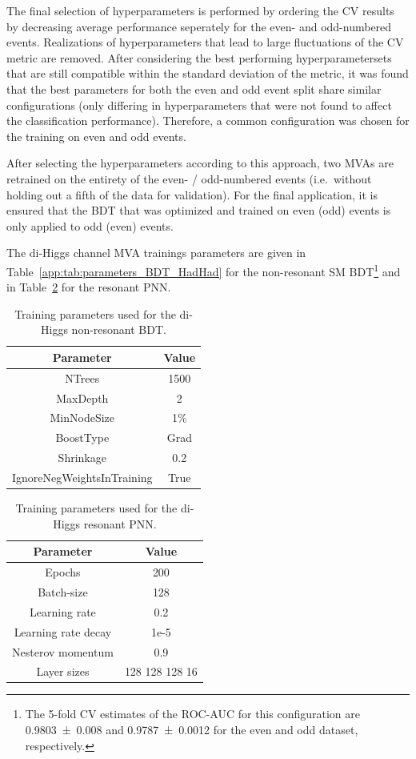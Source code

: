 The final selection of hyperparameters is performed by ordering the CV
results by decreasing average performance seperately for the even- and
odd-numbered events. Realizations of hyperparameters that lead to
large fluctuations of the CV metric are removed. After considering the
best performing hyperparametersets that are still compatible within
the standard deviation of the metric, it was found that the best
parameters for both the even and odd event split share similar
configurations (only differing in hyperparameters that were not
found to affect the classification performance). Therefore, a common
configuration was chosen for the training on even and odd events.

After selecting the hyperparameters according to this approach, two
MVAs are retrained on the entirety of the even- / odd-numbered events
(i.e.\ without holding out a fifth of the data for validation). For
the final application, it is ensured that the BDT that was optimized
and trained on even (odd) events is only applied to odd (even) events.

The di-Higgs \hadhad channel MVA trainings parameters are given in
Table~\ref{app:tab:parameters_BDT_HadHad} for the non-resonant SM
BDT\footnote{The 5-fold CV estimates of the ROC-AUC for this
  configuration are \num{0.9803 +- 0.008} and \num{0.9787 +- 0.0012}
  for the even and odd dataset, respectively.} and in
Table~\ref{tab:parameters_PNN_HadHad} for the resonant PNN.

\begin{table}
\centering
\small
\begin{tabular}{|c|c|}
\hline
Parameter & Value\\
\hline
NTrees & 1500\\
MaxDepth & 2\\
MinNodeSize & 1\%\\
BoostType & Grad\\
Shrinkage & 0.2\\
IgnoreNegWeightsInTraining & True\\
\hline
\end{tabular}
\caption{Training parameters used for the di-Higgs \hadhad non-resonant BDT.}
\label{tab:parameters_BDT_HadHad}
\end{table}

\begin{table}
\centering
\small
\begin{tabular}{|c|c|}
\hline
Parameter & Value\\
\hline
Epochs & 200\\
Batch-size & 128\\
Learning rate & 0.2\\
Learning rate decay & 1e-5\\
Nesterov momentum & 0.9 \\
Layer sizes & 128 128 128 16\\
\hline
\end{tabular}
\caption{Training parameters used for the di-Higgs \hadhad resonant PNN.}
\label{tab:parameters_PNN_HadHad}
\end{table}

